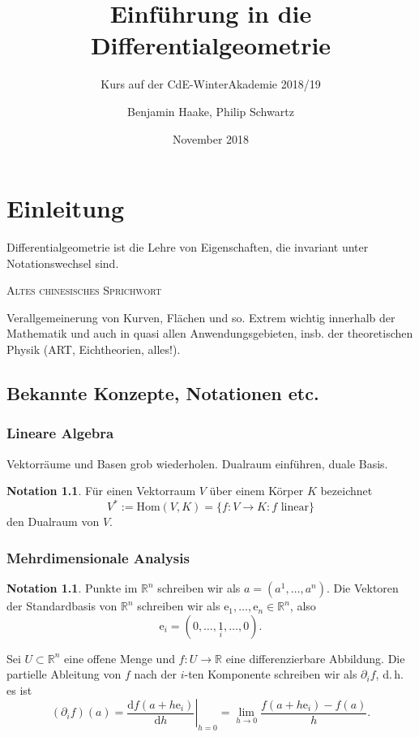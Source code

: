 \documentclass[a4paper]{scrreprt}
\title{Einführung in die Differentialgeometrie}
\subtitle{Kurs auf der CdE-WinterAkademie 2018/19}
\author{Benjamin Haake, Philip Schwartz}
\date{November 2018}
\numberwithin{equation}{chapter}
\newcommand{\D}{\mathrm{d}}
\newcommand{\e}{\mathrm{e}}
\theoremstyle{definition}
\newtheorem{nota}[defn]{Notation}
\begin{document}
\maketitle

\setcounter{chapter}{-1}
\chapter{Einleitung}
\epigraph{Differentialgeometrie ist die Lehre von Eigenschaften, die invariant unter Notationswechsel sind.}{\textsc{Altes chinesisches Sprichwort}}

Verallgemeinerung von Kurven, Flächen und so. Extrem wichtig innerhalb der Mathematik und auch in quasi allen Anwendungsgebieten, insb. der theoretischen Physik (ART, Eichtheorien, alles!).

\section{Bekannte Konzepte, Notationen etc.}

\subsection{Lineare Algebra}

Vektorräume und Basen grob wiederholen. Dualraum einführen, duale Basis.

\begin{nota}
	Für einen Vektorraum $V$ über einem Körper $K$ bezeichnet \[V^* := \mathrm{Hom}(V,K) = \{f\colon V \to K : f \text{ linear}\}\] den Dualraum von $V$.
\end{nota}

\subsection{Mehrdimensionale Analysis}
\begin{nota}
	Punkte im $\mathbb R^n$ schreiben wir als $a = (a^1, \dots, a^n)$. Die Vektoren der Standardbasis von $\mathbb R^n$ schreiben wir als $\e_1, \dots, \e_n \in \mathbb R^n$, also \[\e_i = (0,\dots,\underset{i}{1},\dots,0).\]

	Sei $U \subset \mathbb R^n$ eine offene Menge und $f\colon U \to \mathbb R$ eine differenzierbare Abbildung. Die partielle Ableitung von $f$ nach der $i$-ten Komponente schreiben wir als $\partial_i f$, d.\,h. es ist
	\[(\partial_i f)(a) = \left.\frac{\D f(a + h \e_i)}{\D h}\right|_{h=0} = \lim_{h\to 0} \frac{f(a + h \e_i) - f(a)}{h}.\]
\end{nota}
\end{document}
